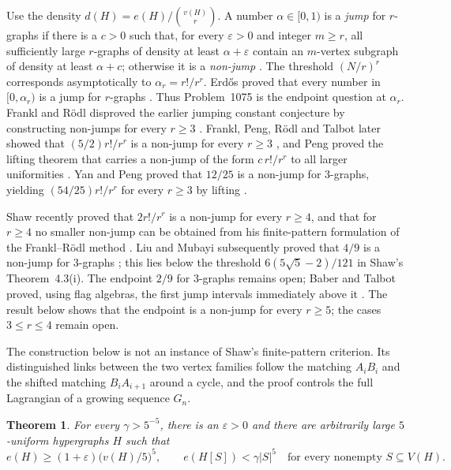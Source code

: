 \documentclass[11pt]{article}
\newtheorem{theorem}{Theorem}
\numberwithin{equation}{section}
\begin{document}
Use the density \(d(H)=e(H)/\binom{v(H)}r\). A number
\(\alpha\in[0,1)\) is a \emph{jump} for \(r\)-graphs if there is a
\(c>0\) such that, for every \(\varepsilon>0\) and integer \(m\ge r\),
all sufficiently large \(r\)-graphs of density at least
\(\alpha+\varepsilon\) contain an \(m\)-vertex subgraph of density
at least \(\alpha+c\); otherwise it is a \emph{non-jump}
\cite{FranklRodl84}. The threshold \((N/r)^r\) corresponds asymptotically to
\(\alpha_r=r!/r^r\). Erd\H{o}s proved that every number in
\([0,\alpha_r)\) is a jump for \(r\)-graphs \cite{Erdos71}. Thus
Problem~1075 is the endpoint question at \(\alpha_r\).
Frankl and R\"odl disproved the earlier jumping constant conjecture by
constructing non-jumps for every \(r\ge3\) \cite{FranklRodl84}.
Frankl, Peng, R\"odl and Talbot later showed that
\((5/2)r!/r^r\) is a non-jump for every \(r\ge3\) \cite{FPRT07},
and Peng proved the lifting theorem that carries a non-jump of the form
\(c\,r!/r^r\) to all larger uniformities \cite{Peng09}. Yan and Peng
proved that \(12/25\) is a non-jump for \(3\)-graphs, yielding
\((54/25)r!/r^r\) for every \(r\ge3\) by lifting \cite{YanPeng23}.

Shaw recently proved that \(2r!/r^r\) is a non-jump for every
\(r\ge4\), and that for \(r\ge4\) no smaller non-jump can be obtained
from his finite-pattern formulation of the Frankl--R\"odl method
\cite[Theorems~4.2 and~4.3]{Shaw26}. Liu and Mubayi subsequently proved
that \(4/9\) is a non-jump for \(3\)-graphs \cite{LiuMubayi26}; this
lies below the threshold \(6(5\sqrt5-2)/121\) in Shaw's
Theorem~4.3(i). The endpoint
\(2/9\) for \(3\)-graphs remains open; Baber and Talbot proved, using
flag algebras, the first jump intervals immediately above it
\cite{BaberTalbot11}. The result below shows that the endpoint is a non-jump for
every \(r\ge5\); the cases \(3\le r\le4\) remain open.

The construction below is not an instance of Shaw's
finite-pattern criterion. Its distinguished links between the two
vertex families follow the matching \(A_iB_i\) and the shifted matching
\(B_iA_{i+1}\) around a cycle, and the proof controls the full
Lagrangian of a growing sequence \(G_n\).

\begin{theorem}\label{thm:main}
For every \(\gamma>5^{-5}\), there is an \(\varepsilon>0\) and
there are arbitrarily large \(5\)-uniform hypergraphs \(H\) such that
\[
 e(H)\ge(1+\varepsilon)\bigl(v(H)/5\bigr)^{5},
 \qquad
 e(H[S])<\gamma|S|^{5}
 \quad\text{for every nonempty }S\subseteq V(H).
\]
\end{theorem}
\end{document}
